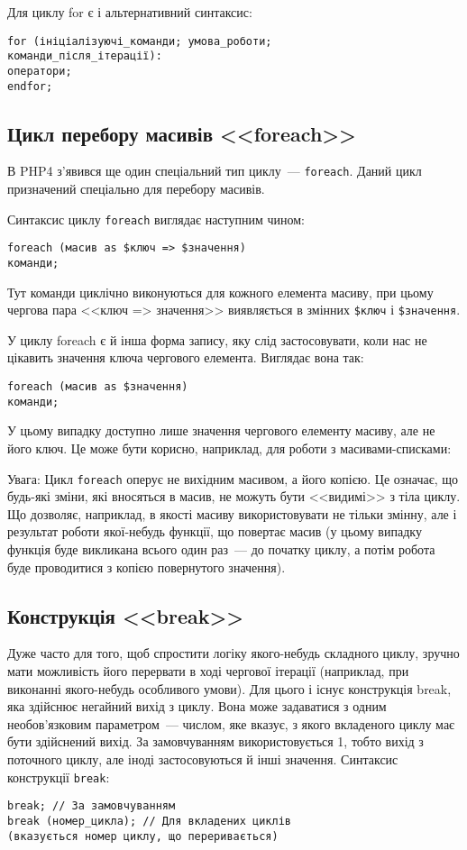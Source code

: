 Для циклу for є і альтернативний синтаксис:
\begin{verbatim}
for (ініціалізуючі_команди; умова_роботи; 
команди_після_ітерації):
оператори;
endfor;
\end{verbatim}

\subsection*{Цикл перебору масивів <<foreach>>}
В PHP4 з'явився ще один спеціальний тип циклу~--- \verb'foreach'. Даний цикл призначений спеціально для перебору масивів.

Синтаксис циклу \verb'foreach' виглядає наступним чином:
\begin{verbatim}
foreach (масив as $ключ => $значення)
команди;
\end{verbatim}
Тут команди циклічно виконуються для кожного елемента масиву, при цьому чергова пара <<ключ => значення>> виявляється в змінних \verb'$ключ' і \verb'$значення'. 

У циклу foreach є й інша форма запису, яку слід застосовувати, коли нас не цікавить значення ключа чергового елемента. Виглядає вона так:
\begin{verbatim}
foreach (масив as $значення)
команди;
\end{verbatim}
У цьому випадку доступно лише значення чергового елементу масиву, але не його ключ. Це може бути корисно, наприклад, для роботи з масивами-списками:



Увага: Цикл \verb'foreach' оперує не вихідним масивом, а його копією. Це означає, що будь-які зміни, які вносяться в масив, не можуть бути <<видимі>> з тіла циклу. Що дозволяє, наприклад, в якості масиву використовувати не тільки змінну, але і результат роботи якої-небудь функції, що повертає масив (у цьому випадку функція буде викликана всього один раз~--- до початку циклу, а потім робота буде проводитися з копією повернутого значення).

\subsection*{Конструкція <<break>>}
Дуже часто для того, щоб спростити логіку якого-небудь складного циклу, зручно мати можливість його перервати в ході чергової ітерації (наприклад, при виконанні якого-небудь особливого умови). Для цього і існує конструкція break, яка здійснює негайний вихід з циклу. Вона може задаватися з одним необов'язковим параметром~--- числом, яке вказує, з якого вкладеного циклу має бути здійснений вихід. За замовчуванням використовується 1, тобто вихід з поточного циклу, але іноді застосовуються й інші значення. Синтаксис конструкції \verb'break':
\begin{verbatim}
break; // За замовчуванням
break (номер_цикла); // Для вкладених циклів 
(вказується номер циклу, що переривається)
\end{verbatim}

